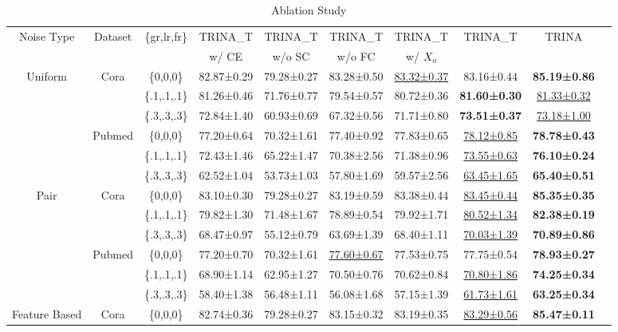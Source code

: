 \documentclass[sigconf, anonymous, review]{acmart}
\begin{document}
\begin{table}
  \centering
  \caption{Ablation Study}
  {\small
  \begin{tabular}{cccccccccc}
    \toprule
    \multirow{2}{*}{Noise Type} &\multirow{2}{*}{Dataset}&\multirow{2}{*}{\{gr,lr,fr\}}
    & TRINA\_T & TRINA\_T & TRINA\_T & TRINA\_T &\multirow{2}{*}{TRINA\_T}  &\multirow{2}{*}{TRINA}\\
    &&& w/ CE & w/o SC & w/o FC & w/ $X_o$ & &\\
    \midrule
    \multirow{6}{*}{Uniform} & \multirow{3}{*}{Cora} &\{0,0,0\}&82.87±0.29 &79.28±0.27&83.28±0.50 &\underline{83.32±0.37}&83.16±0.44& \textbf{85.19±0.86} \\
    &  &\{.1,.1,.1\}&81.26±0.46 &71.76±0.77&79.54±0.57 &80.72±0.36&\textbf{81.60±0.30}&\underline{81.33±0.32}  \\
    &  &\{.3,.3,.3\}&72.84±1.40 &60.93±0.69&67.32±0.56 &71.71±0.80&\textbf{73.51±0.37}&\underline{73.18±1.00 } \\
    & \multirow{3}{*}{Pubmed} &\{0,0,0\}&77.20±0.64 &70.32±1.61& 77.40±0.92&77.83±0.65&\underline{78.12±0.85}&\textbf{78.78±0.43}  \\
    &  &\{.1,.1,.1\}&72.43±1.46 &65.22±1.47& 70.38±2.56&71.38±0.96&\underline{73.55±0.63}&\textbf{76.10±0.24}  \\
    &  &\{.3,.3,.3\}&62.52±1.04&53.73±1.03& 57.80±1.69&59.57±2.56&\underline{63.45±1.65}&\textbf{65.40±0.51}  \\
    \midrule
    \multirow{6}{*}{Pair} & \multirow{3}{*}{Cora} &\{0,0,0\}&83.10±0.30 &79.28±0.27&83.19±0.59 &83.38±0.44&\underline{83.45±0.44}&\textbf{85.35±0.35}  \\
    &  &\{.1,.1,.1\}&79.82±1.30 &71.48±1.67&78.89±0.54 &79.92±1.71&\underline{80.52±1.34}&\textbf{82.38±0.19}  \\
    &  &\{.3,.3,.3\}&68.47±0.97 &55.12±0.79&63.69±1.39 &68.40±1.11&\underline{70.03±1.39}&\textbf{70.89±0.86 } \\
    & \multirow{3}{*}{Pubmed} &\{0,0,0\}&77.20±0.70&70.32±1.61&\underline{77.60±0.67} &77.53±0.75&77.75±0.54&\textbf{78.93±0.27}  \\
    &  &\{.1,.1,.1\}&68.90±1.14 &62.95±1.27&70.50±0.76 &70.62±0.84&\underline{70.80±1.86}&\textbf{74.25±0.34}  \\
    &  &\{.3,.3,.3\}&58.40±1.38 &56.48±1.11& 56.08±1.68&57.15±1.39&\underline{61.73±1.61}&\textbf{63.25±0.34}  \\
    \midrule
    \multirow{6}{*}{Feature Based} & \multirow{3}{*}{Cora} &\{0,0,0\}&82.74±0.36 &79.28±0.27&83.15±0.32 &83.19±0.35&\underline{83.29±0.56}&\textbf{85.47±0.11}  \\

\end{tabular}}
\end{table}
\end{document}
